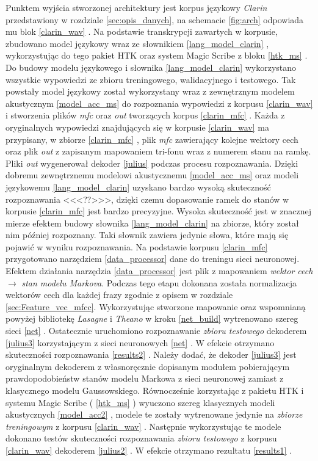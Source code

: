\documentclass[11pt]{article}
\newcommand{\refBlock}[1]{%
	\hyperref[#1]{\ref*{#1}}%
}
\begin{document}
	Punktem wyjścia stworzonej architektury jest korpus językowy \textit{Clarin} przedstawiony w rozdziale \ref{sec:opis_danych}, na schemacie \ref{fig:arch} odpowiada mu blok \refBlock{clarin_wav}. Na podstawie transkrypcji zawartych w korpusie, zbudowano model językowy wraz ze słownikiem \refBlock{lang_model_clarin}, wykorzystując do tego pakiet HTK oraz system Magic Scribe z bloku \refBlock{htk_ms}. Do budowy modelu językowego i słownika \refBlock{lang_model_clarin} wykorzystano wszystkie wypowiedzi ze zbioru treningowego, walidacyjnego i testowego. Tak powstały model językowy został wykorzystany wraz z zewnętrznym modelem akustycznym \refBlock{model_acc_ms} do rozpoznania wypowiedzi z korpusu \refBlock{clarin_wav} i stworzenia plików \textit{mfc} oraz \textit{out} tworzących korpus \refBlock{clarin_mfc}. Każda z oryginalnych wypowiedzi znajdujących się w korpusie \refBlock{clarin_wav} ma przypisany, w zbiorze \refBlock{clarin_mfc}, plik \textit{mfc} zawierający kolejne wektory cech oraz plik \textit{out} z zapisanym mapowaniem tri-fonu wraz z numerem stanu na ramkę. Pliki \textit{out} wygenerował dekoder \refBlock{julius} podczas procesu rozpoznawania. Dzięki dobremu zewnętrznemu  modelowi akustycznemu \refBlock{model_acc_ms} oraz modeli językowemu \refBlock{lang_model_clarin} uzyskano bardzo wysoką skuteczność rozpoznawania <<<??>>>, dzięki czemu dopasowanie ramek do stanów w korpusie \refBlock{clarin_mfc} jest bardzo precyzyjne. Wysoka skuteczność jest w znacznej mierze efektem budowy słownika \refBlock{lang_model_clarin} na zbiorze, który został nim później rozpoznany. Taki słownik zawiera jedynie słowa, które mają się pojawić w wyniku rozpoznawania. Na podstawie korpusu \refBlock{clarin_mfc} przygotowano narzędziem \refBlock{data_processor} dane do treningu sieci neuronowej. Efektem działania narzędzia \refBlock{data_processor} jest plik z mapowaniem \textit{wektor cech} $\longrightarrow$ \textit{stan modelu Markova}. Podczas tego etapu dokonana została normalizacja wektorów cech dla każdej frazy zgodnie z opisem w rozdziale \ref{sec:Feature_vec_mfcc}. Wykorzystując stworzone mapowanie oraz wspomnianą powyżej bibliotekę \textit{Lasagne} i \textit{Theano} w kroku \refBlock{net_build} wytrenowano szereg sieci \refBlock{net}. Ostatecznie uruchomiono rozpoznawanie \textit{zbioru testowego} dekoderem \refBlock{julius3} korzystającym z sieci neuronowych \refBlock{net}. W efekcie otrzymano skuteczności rozpoznawania \refBlock{results2}. Należy dodać, że dekoder \refBlock{julius3} jest oryginalnym dekoderem z własnoręcznie dopisanym modułem pobierającym prawdopodobieństw stanów modelu Markowa z sieci neuronowej zamiast z klasycznego modelu Gaussowskiego. Równocześnie korzystając z pakietu HTK i systemu Magic Scribe (\refBlock{htk_ms}) wyuczono szereg klasycznych modeli akustycznych \refBlock{model_acc2}, modele te zostały wytrenowane jedynie na \textit{zbiorze treningowym} z korpusu \refBlock{clarin_wav}. Następnie wykorzystując te modele dokonano testów skuteczności rozpoznawania \textit{zbioru testowego} z korpusu \refBlock{clarin_wav} dekoderem \refBlock{julius2}. W efekcie otrzymano rezultatu \refBlock{results1}.
	
\end{document}
